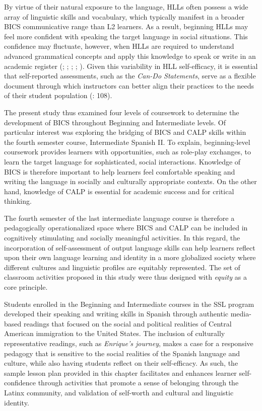 \documentclass[output=paper]{langscibook}
\begin{document}
By virtue of their natural exposure to the language, HLLs often possess a wide array of linguistic skills and vocabulary, which typically manifest in a broader BICS communicative range than L2 learners. As a result, beginning HLLs may feel more confident with speaking the target language in social situations. This confidence may fluctuate, however, when HLLs are required to understand advanced grammatical concepts and apply this knowledge to speak or write in an academic register (\citealt{Beaudrie2009}; \citealt{Carreira2003}; \citealt{Correa2011}; \citealt{Montrul2011}; \citealt{Zyzik2016}). Given this variability in HLL self-efficacy, it is essential that self-reported assessments, such as the \textit{Can-Do Statements}, serve as a flexible document through which instructors can better align their practices to the needs of their student population (\citealt{CoxWinke2018}: 108).

The present study thus examined four levels of coursework to determine the development of BICS throughout Beginning and Intermediate levels. Of particular interest was exploring the bridging of BICS and CALP skills within the fourth semester course, Intermediate Spanish II. To explain, beginning-level coursework provides learners with opportunities, such as role-play exchanges, to learn the target language for sophisticated, social interactions. Knowledge of BICS is therefore important to help learners feel comfortable speaking and writing the language in socially and culturally appropriate contexts. On the other hand, knowledge of CALP is essential for academic success and for critical thinking.

The fourth semester of the last intermediate language course is therefore a pedagogically operationalized space where BICS and CALP can be included in cognitively stimulating and socially meaningful activities. In this regard, the incorporation of self-assessment of output language skills can help learners reflect upon their own language learning and identity in a more globalized society where different cultures and linguistic profiles are equitably represented. The set of classroom activities proposed in this study were thus designed with \textit{equity} as a core principle.

Students enrolled in the Beginning and Intermediate courses in the SSL program developed their speaking and writing skills in Spanish through authentic media-based readings that focused on the social and political realities of Central American immigration to the United States. The inclusion of culturally representative readings, such as \textit{Enrique’s journey}, makes a case for a responsive pedagogy that is sensitive to the social realities of the Spanish language and culture, while also having students reflect on their self-efficacy. As such, the sample lesson plan provided in this chapter facilitates and enhances learner self-confidence through activities that promote a sense of belonging through the Latinx community, and validation of self-worth and cultural and linguistic identity.
\end{document}
